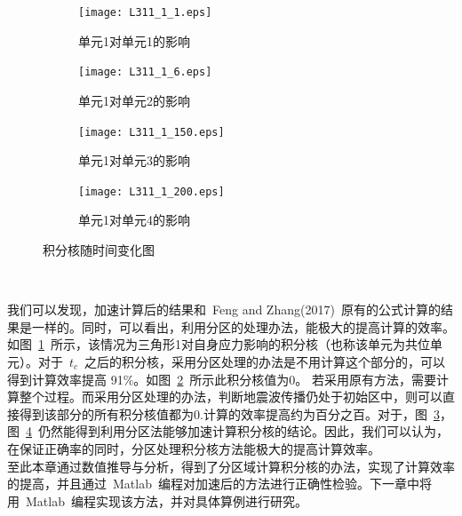  \begin{figure}[htb]
  \centering
  \begin{subfigure}[b]{0.45\linewidth}
    \texttt{[image: L311\_1\_1.eps]}
    \caption{单元1对单元1的影响}\label{fig:danyuan1}
  \end{subfigure}
  \begin{subfigure}[b]{0.45\linewidth}
    \texttt{[image: L311\_1\_6.eps]}
    \caption{单元1对单元2的影响}\label{fig:danyuan2}
  \end{subfigure}
  \begin{subfigure}[b]{0.45\linewidth}
    \texttt{[image: L311\_1\_150.eps]}
    \caption{单元1对单元3的影响}\label{fig:danyuan3}
  \end{subfigure}
  \begin{subfigure}[b]{0.45\linewidth}
    \texttt{[image: L311\_1\_200.eps]}
    \caption{单元1对单元4的影响}\label{fig:danyuan4}
  \end{subfigure}
  \caption{积分核随时间变化图}\label{fig:demenstrate}
\end{figure}
\\

\indent 我们可以发现，加速计算后的结果和~Feng and Zhang(2017)~原有的公式计算的结果是一样的。同时，可以看出，利用分区的处理办法，能极大的提高计算的效率。如图~\ref{fig:danyuan1}~所示，该情况为三角形1对自身应力影响的积分核（也称该单元为共位单元）。对于~$t_c$~之后的积分核，采用分区处理的办法是不用计算这个部分的，可以得到计算效率提高 91\%。如图~\ref{fig:danyuan2}~所示此积分核值为0。 若采用原有方法，需要计算整个过程。而采用分区处理的办法，判断地震波传播仍处于初始区中，则可以直接得到该部分的所有积分核值都为0.计算的效率提高约为百分之百。对于，图~\ref{fig:danyuan3}，图~\ref{fig:danyuan4}~仍然能得到利用分区法能够加速计算积分核的结论。因此，我们可以认为，在保证正确率的同时，分区处理积分核方法能极大的提高计算效率。\\
    \indent 至此本章通过数值推导与分析，得到了分区域计算积分核的办法，实现了计算效率的提高，并且通过~Matlab~编程对加速后的方法进行正确性检验。下一章中将用~Matlab~编程实现该方法，并对具体算例进行研究。

		
